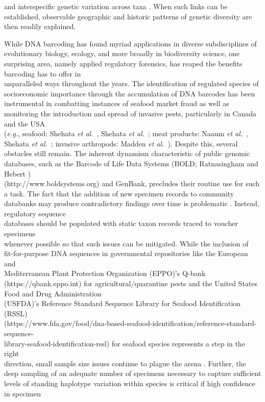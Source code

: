 and interspecific genetic variation across taxa \cite{phillips2019incomplete}. When such links can be established, observable geographic and historic patterns of genetic diversity are then readily explained.



While DNA barcoding has found myriad applications in diverse subdisciplines of \\ evolutionary biology, ecology, and more broadly in biodiversity science, one surprising area, namely applied regulatory forensics, has reaped the benefits barcoding has to offer in \\ unparalleled ways throughout the years. The identification of regulated species of \\ socioeconomic importance through the accumulation of DNA barcodes has been \\ instrumental in combatting instances of seafood market fraud as well as monitoring the introduction and spread of invasive pests, particularly in Canada and the USA \\ (\textit{e.g.}, seafood: Shehata \textit{et al.}~\cite{shehata2018dna}, Shehata \textit{et al.}~\cite{shehata2019survey}; meat products: Naaum \textit{et al.}~\cite{naaum2018complementary}, Shehata \textit{et al.}~\cite{shehata2019revisiting}; invasive arthropods: Madden \textit{et al.}~\cite{madden2019using}). Despite this, several obstacles still remain. The inherent dynamism characteristic of public genomic databases, such as the Barcode of Life Data Systems (BOLD; Ratnasingham and Hebert \cite{ratnasingham2007bold}) \\ (http://www.boldsystems.org) and GenBank, precludes their routine use for such a task. The fact that the addition of new specimen records to community databanks may produce contradictory findings over time is problematic \cite{phillips2020hacsim}. Instead, regulatory sequence \\ databases should be populated with static taxon records traced to voucher specimens \\ whenever possible so that such issues can be mitigated. While the inclusion of \\ fit-for-purpose DNA sequences in governmental repositories like the European and \\ Mediterranean Plant Protection Organization (EPPO)'s Q-bank (https://qbank.eppo.int) for agricultural/quarantine pests and the United States Food and Drug Administration \\ (USFDA)'s Reference Standard Sequence Library for Seafood Identification (RSSL) \\ (https://www.fda.gov/food/dna-based-seafood-identification/reference-standard-sequence-\\library-seafood-identification-rssl) for seafood species represents a step in the right \\ direction, small sample size issues continue to plague the arena \cite{phillips2020hacsim}. Further, the deep sampling of an adequate number of specimens necessary to capture sufficient levels of standing haplotype variation within species is critical if high confidence in specimen \\ 